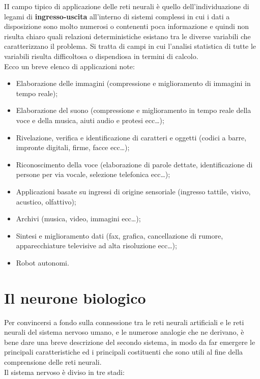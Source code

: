 \documentclass[12pt,a4paper,oneside]{book}
\begin{document}
		II campo tipico di applicazione delle reti neurali è quello dell'individuazione di legami di \textbf{ingresso-uscita} all'interno di sistemi complessi in cui i dati a disposizione sono molto 
		numerosi o contenenti poca informazione e quindi non risulta chiaro quali relazioni deterministiche esistano tra le diverse variabili che caratterizzano il problema. Si tratta di campi in cui l'analisi statistica di tutte le variabili risulta difficoltosa o dispendiosa in termini di calcolo.\\ 
		Ecco un breve elenco di applicazioni note:
		
		\begin{itemize}
			\item Elaborazione delle immagini (compressione e miglioramento di immagini in tempo reale);
			\item Elaborazione del suono (compressione e miglioramento in tempo reale della voce e della musica, aiuti audio e protesi ecc\dots);
			\item Rivelazione, verifica e identificazione di caratteri e oggetti (codici a barre, impronte digitali, firme, facce ecc\dots );  
			\item Riconoscimento della voce (elaborazione di parole dettate, identificazione di persone per via vocale, selezione telefonica ecc\dots );
			\item Applicazioni basate su ingressi di origine sensoriale (ingresso tattile, visivo, acustico, olfattivo);
			\item Archivi (musica, video, immagini ecc\dots);
			\item Sintesi e miglioramento dati (fax, grafica, cancellazione di rumore, apparecchiature televisive ad alta risoluzione ecc\dots);
			\item Robot autonomi.
		\end{itemize}

		
		
	\section{Il neurone biologico}
		
		Per convincersi a fondo sulla connessione tra le reti neurali artificiali e le reti neurali del sistema nervoso umano, e le numerose analogie che ne derivano, è bene dare una breve descrizione del secondo sistema, in modo da far emergere le principali caratteristiche ed i principali costituenti che sono utili al fine della comprensione delle reti neurali.\\
  		Il sistema nervoso è diviso in tre stadi:
		
\end{document}
